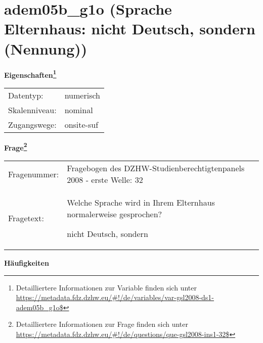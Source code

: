 
    \setcounter{footnote}{0}

    \vspace*{-1.8cm}
	\section{adem05b\_g1o (Sprache Elternhaus: nicht Deutsch, sondern (Nennung))}
	\label{section:adem05b_g1o}



    \vspace*{0.5cm}
    \noindent\textbf{Eigenschaften\footnote{Detailliertere Informationen zur Variable finden sich unter
		\url{https://metadata.fdz.dzhw.eu/\#!/de/variables/var-gsl2008-ds1-adem05b_g1o$}}}\\
	\begin{tabularx}{\hsize}{@{}lX}
	Datentyp: & numerisch \\
	Skalenniveau: & nominal \\
	Zugangswege: &
	  onsite-suf
 \\
    \end{tabularx}



				\vspace*{0.5cm}
                \noindent\textbf{Frage\footnote{Detailliertere Informationen zur Frage finden sich unter
		              \url{https://metadata.fdz.dzhw.eu/\#!/de/questions/que-gsl2008-ins1-32$}}}\\
				\begin{tabularx}{\hsize}{@{}lX}
					Fragenummer: &
					  Fragebogen des DZHW-Studienberechtigtenpanels 2008 - erste Welle:
					  32
 \\
					Fragetext: & Welche Sprache wird in Ihrem Elternhaus normalerweise gesprochen?\par  nicht Deutsch, sondern \\
				\end{tabularx}





        		\vspace*{0.5cm}
                \noindent\textbf{Häufigkeiten}

